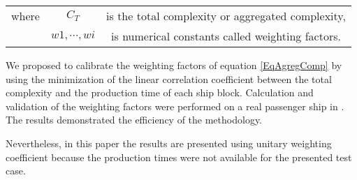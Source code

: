 \begin{tabular}{ l c c }
    where   & $C_T$ & is the total complexity or aggregated complexity,\\
            & $w1, \cdots , wi$	& is numerical constants called weighting factors.
\end{tabular}

We proposed to calibrate the weighting factors of equation \ref{EqAgregComp} by using the minimization of the linear correlation coefficient between the total complexity and the production time of each ship block. Calculation and validation of the weighting factors were performed on a real passenger ship in \cite{CapraceCAD12}. The results demonstrated the efficiency of the methodology.

Nevertheless, in this paper the results are presented using unitary weighting coefficient because the production times were not available for the presented test case.

